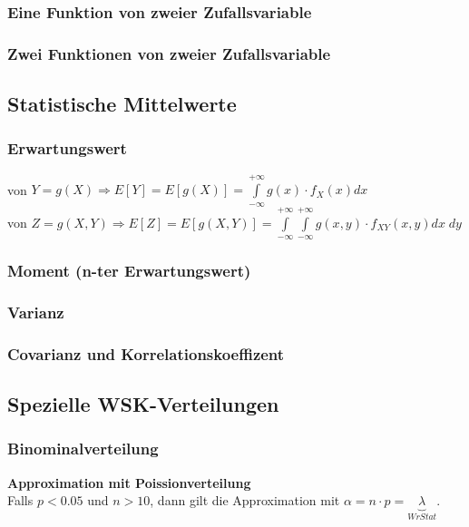 \subsubsection{Eine Funktion von zweier Zufallsvariable }
\subsubsection{Zwei Funktionen von zweier Zufallsvariable }
\vspace{0.25cm}

\subsection{Statistische Mittelwerte }
\subsubsection{Erwartungswert } 
	\vspace{-0.2cm} \hspace*{0.2cm}
	\parbox{16cm}{von $Y = g(X) \Rightarrow E[Y] = E[g(X)] = \int\limits_{-\infty}^{+\infty}g(x)\cdot f_X(x) d x$ \\ 
	von $Z = g(X,Y) \Rightarrow E[Z] = E[g(X,Y)] = \int\limits_{-\infty}^{+\infty}\int\limits_{-\infty}^{+\infty} g(x,y) \cdot f_{XY}(x,y) dx \; dy$}
	\vspace{-0.2cm}
\subsubsection{Moment (n-ter Erwartungswert) }
\subsubsection{Varianz}
\subsubsection{Covarianz und Korrelationskoeffizent }
\vspace{0.25cm}

\subsection{Spezielle WSK-Verteilungen }
\subsubsection{Binominalverteilung}\label{binominalverteilung}
\textbf{Approximation mit Poissionverteilung} \\
\hspace*{0.2cm} Falls $p < 0.05$ und $n > 10$, dann gilt die Approximation mit $\alpha = n \cdot p = \underbrace{\lambda}_{WrStat}$. \\
\vspace{-0.3cm}

